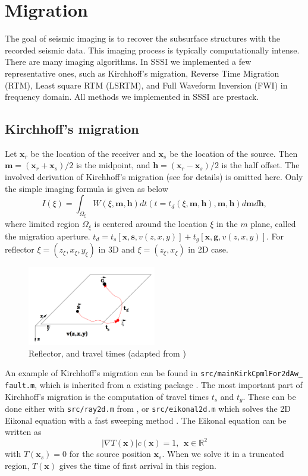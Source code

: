 \documentclass[12pt]{article}
\newcommand{\real}{\mathbb{R}}
\newcommand{\bx}{\boldsymbol{x}}
\newcommand{\bg}{\boldsymbol{g}}
\newcommand{\bh}{\boldsymbol{h}}
\newcommand{\bs}{\boldsymbol{s}}
\newcommand{\bm}{\boldsymbol{m}}
\theoremstyle{plain}
\theoremstyle{definition}
\theoremstyle{remark}
\numberwithin{equation}{section}
\begin{document}
\section{Migration}
The goal of seismic imaging is to recover the subsurface structures with the recorded seismic data. This imaging process is 
typically computationally intense. There are many imaging algorithms. In SSSI we implemented a few representative ones, such as
Kirchhoff's migration, Reverse Time Migration (RTM), Least square RTM (LSRTM), and Full Waveform Inversion (FWI) in frequency domain.
All methods we implemented in SSSI are prestack.  

\subsection{Kirchhoff's migration}
Let $\bx_r$ be the location of the receiver and $\bx_s$ be the location of the source. 
Then $\bm=(\bx_r+\bx_s)/2$ is the midpoint, and $\bh=(\bx_r-\bx_s)/2$ is the half offset.
The involved derivation of Kirchhoff's migration (see \cite{Sch1978} for details) is omitted here. Only the simple imaging formula 
is given as below
\begin{equation}
I(\xi)=\int_{\Omega_\xi} W(\xi,\bm,\bh)dt(t=t_d(\xi,
\bm,\bh),\bm,\bh)d\bm d\bh,
\end{equation}
where limited region $\Omega_\xi$ is centered around the location $\xi$
in the $m$ plane, called the migration aperture. $t_d=t_s[\bx,\bs,v(z,x,y)]+t_g[\bx,\bg,v(z,x,y)]$.
For reflector $\xi = (z_\xi, x_\xi, y_\xi)$ in 3D and $\xi = (z_\xi, x_\xi)$ in 2D case.

  \begin{figure}
  \centering
  \includegraphics[width=0.5\textwidth]{Fig/tstg.PNG}
  \caption{Reflector, and travel times (adapted from \cite{bio2006})}
  \end{figure}
  
An example of Kirchhoff's migration can be found in \texttt{src/mainKirkCpmlFor2dAw\_ fault.m}, which is 
inherited from a existing package \cite{Koz2011}.
The most important part of Kirchhoff's migration is the computation of travel times $t_s$ and $t_g$.   
These can be done either with \texttt{src/ray2d.m} from \cite{Koz2011}, or
\texttt{src/eikonal2d.m} which solves the 2D Eikonal equation with a fast sweeping method \cite{Zha2004}.
The Eikonal equation can be written as
\begin{equation}
|\nabla T(\bx)| c(\bx)= 1, ~~\bx\in \real^2
\end{equation}
with $T(\bx_s) = 0$ for the source position $\bx_s$. When we solve it in a truncated region, $T(\bx)$ gives the time of first 
arrival in this region.
\end{document}
